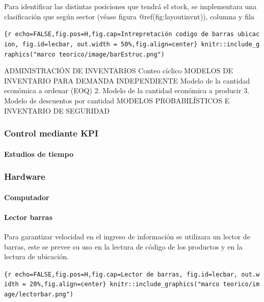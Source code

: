 \documentclass[11pt]{article}
\begin{document}
Para identificar las distintas posiciones que tendrá el stock, se
implementara una clasificación que según sector (véase figura
@ref(fig:layoutinvnt)), columna y fila

\texttt{\{r\ echo=FALSE,fig.pos=\textquotesingle{}H\textquotesingle{},fig.cap=\textquotesingle{}Intrepretación\ codigo\ de\ barras\ ubicacion\textquotesingle{},\ fig.id=\textquotesingle{}lecbar\textquotesingle{},\ out.width\ =\ \textquotesingle{}50\%\textquotesingle{},fig.align=\textquotesingle{}center\textquotesingle{}\}\ knitr::include\_graphics("marco\ teorico/image/barEstruc.png")}

ADMINISTRACIÓN DE INVENTARIOS Conteo cíclico MODELOS DE INVENTARIO PARA
DEMANDA INDEPENDIENTE Modelo de la cantidad económica a ordenar (EOQ) 2.
Modelo de la cantidad económica a producir 3. Modelo de descuentos por
cantidad MODELOS PROBABILÍSTICOS E INVENTARIO DE SEGURIDAD

\hypertarget{control-mediante-kpi}{%
\subsubsection{Control mediante KPI}\label{control-mediante-kpi}}

\hypertarget{estudios-de-tiempo}{%
\paragraph{Estudios de tiempo}\label{estudios-de-tiempo}}

\hypertarget{hardware}{%
\subsubsection{Hardware}\label{hardware}}

\hypertarget{computador}{%
\paragraph{Computador}\label{computador}}

\hypertarget{lector-barras}{%
\paragraph{Lector barras}\label{lector-barras}}

Para garantizar velocidad en el ingreso de información se utilizara un
lector de barras, este se prevee su uso en la lectura de código de los
productos y en la lectura de ubicación.

\texttt{\{r\ echo=FALSE,fig.pos=\textquotesingle{}H\textquotesingle{},fig.cap=\textquotesingle{}Lector\ de\ barras\textquotesingle{},\ fig.id=\textquotesingle{}lecbar\textquotesingle{},\ out.width\ =\ \textquotesingle{}20\%\textquotesingle{},fig.align=\textquotesingle{}center\textquotesingle{}\}\ knitr::include\_graphics("marco\ teorico/image/lectorbar.png")}
\end{document}

